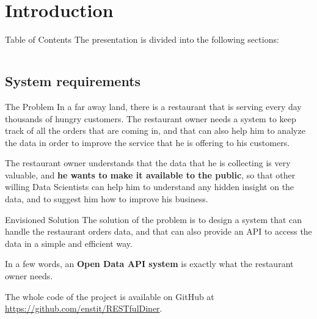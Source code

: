 

\section[Introduction]{Introduction}

\begin{frame}{Table of Contents}
	The presentation is divided into the following sections:
	\begin{columns}[t]
        \begin{column}{.5\textwidth}
            \tableofcontents[sections={1-2}]
        \end{column}
        \begin{column}{.5\textwidth}
            \tableofcontents[sections={3-5}]
        \end{column}
    \end{columns}
\end{frame}

\subsection{System requirements}

\begin{frame}{The Problem}
	In a far away land, there is a restaurant that is serving every day
	thousands of hungry customers. The restaurant owner needs a system to keep
	track of all the orders that are coming in, and that can also help him to
	analyze the data in order to improve the service that he is offering to his
	customers.

	The restaurant owner understands that the data that he is collecting is very
	valuable, and \textbf{he wants to make it available to the public}, so that
	other willing Data Scientists can help him to understand any hidden insight
	on the data, and to suggest him how to improve his business.
\end{frame}

\begin{frame}{Envisioned Solution}
	The solution of the problem is to design a system that can handle the
	restaurant orders data, and that can also provide an API to access the data
	in a simple and efficient way.

	In a few words, an \textbf{Open Data API system} is exactly what the
	restaurant owner needs.

	The whole code of the project is available on GitHub at
	\url{https://github.com/enstit/RESTfulDiner}.
\end{frame}
